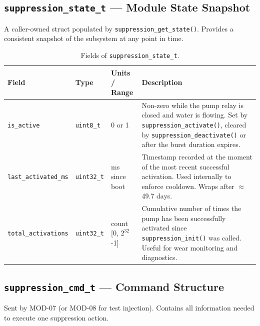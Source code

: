 \documentclass[12pt]{article}
\begin{document}
\subsection{\texttt{suppression\_state\_t} --- Module State Snapshot}

A caller-owned struct populated by \texttt{suppression\_get\_state()}. Provides a consistent snapshot of the subsystem at any point in time.

\begin{table}[H]
\centering\small
\begin{tabularx}{\textwidth}{L{3.5cm} L{2.5cm} L{2.5cm} X}
\toprule
\textbf{Field} & \textbf{Type} & \textbf{Units / Range} & \textbf{Description} \\
\midrule
\texttt{is\_active} & \texttt{uint8\_t} & 0 or 1 & Non-zero while the pump relay is closed and water is flowing. Set by \texttt{suppression\_activate()}, cleared by \texttt{suppression\_deactivate()} or after the burst duration expires. \\[4pt]
\texttt{last\_activated\_ms} & \texttt{uint32\_t} & ms since boot & Timestamp recorded at the moment of the most recent successful activation. Used internally to enforce cooldown. Wraps after $\approx$49.7 days. \\[4pt]
\texttt{total\_activations} & \texttt{uint32\_t} & count [0, $2^{32}$-1] & Cumulative number of times the pump has been successfully activated since \texttt{suppression\_init()} was called. Useful for wear monitoring and diagnostics. \\
\bottomrule
\end{tabularx}
\caption{Fields of \texttt{suppression\_state\_t}.}
\end{table}

\subsection{\texttt{suppression\_cmd\_t} --- Command Structure}

Sent by MOD-07 (or MOD-08 for test injection). Contains all information needed to execute one suppression action.
\end{document}

